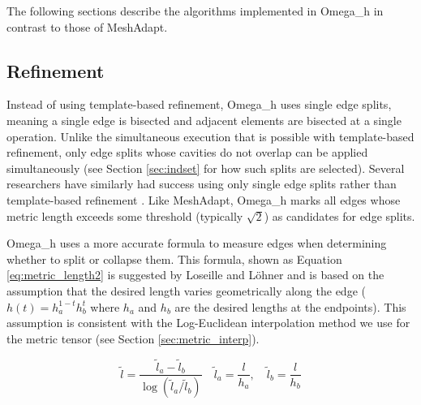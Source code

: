 The following sections describe the algorithms implemented
in Omega\_h in contrast to those of MeshAdapt.

\subsection{Refinement}
\label{sec:osh_refine}

Instead of using template-based refinement, Omega\_h
uses single edge splits, meaning a single edge is
bisected and adjacent elements are bisected
at a single operation.
Unlike the simultaneous execution that is possible
with template-based refinement, only edge
splits whose cavities do not overlap can be
applied simultaneously (see Section \ref{sec:indset}
for how such splits are selected).
Several researchers have similarly had success
using only single edge splits rather than
template-based refinement
\cite{michal2012anisotropic,compere2010mesh,loseille20093d}.
Like MeshAdapt, Omega\_h marks all edges whose
metric length exceeds some threshold (typically $\sqrt{2}$) as candidates
for edge splits.

Omega\_h uses a more accurate formula to measure
edges when determining whether to split or collapse them.
This formula, shown as Equation \ref{eq:metric_length2}
is suggested by Loseille and L{\"o}hner \cite{loseille20093d} and
is based on the assumption that the desired length varies
geometrically along the edge ($h(t)=h_a^{1-t}h_b^t$ where $h_a$ and $h_b$
are the desired lengths at the endpoints).
This assumption is consistent with the Log-Euclidean interpolation method we
use for the metric tensor (see Section \ref{sec:metric_interp}).

\begin{equation} \label{eq:metric_length2}
\tilde{l} =
\frac{\tilde{l}_a - \tilde{l}_b}{\log\left(\tilde{l}_a / \tilde{l}_b\right)}
\quad
\tilde{l}_a = \frac{l}{h_a},\quad
\tilde{l}_b = \frac{l}{h_b}
\end{equation}

